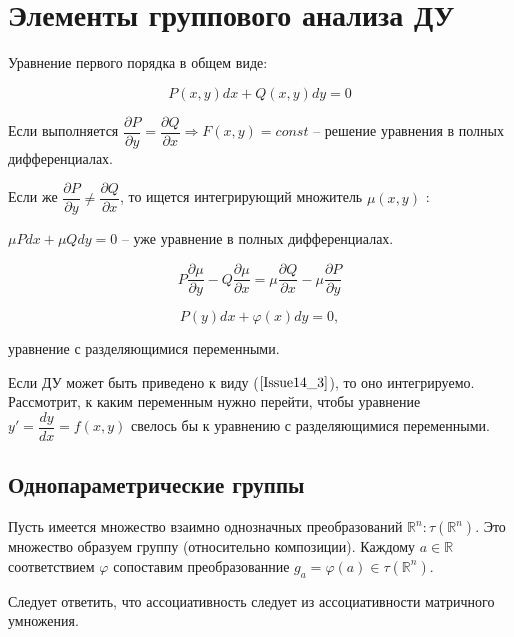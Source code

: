  




\section{Элементы группового анализа ДУ}

Уравнение первого порядка в общем виде:

\begin{equation}
	P(x,y)dx + Q(x,y)dy = 0
	\label{Issue14_1}
\end{equation}

Если выполняется $\dfrac{\partial P}{\partial y} = \dfrac{\partial Q}{\partial x} \Rightarrow F(x,y) = const$ -- решение уравнения в полных дифференциалах.

Если же $\dfrac{\partial P}{\partial y} \neq \dfrac{\partial Q}{\partial x}$, то ищется интегрирующий множитель $\mu(x,y)$ :

$\mu Pdx + \mu Qdy = 0$ -- уже уравнение в полных дифференциалах.

\begin{equation}
	P\frac{\partial \mu}{\partial y} - Q \frac{\partial \mu}{\partial x} = \mu \dfrac{\partial Q}{\partial x} - \mu \dfrac{\partial P}{\partial y}
	\label{Issue14_2}
\end{equation}

\begin{equation}
	P(y)dx + \varphi(x)dy = 0,
	\label{Issue14_3}
\end{equation}

уравнение с разделяющимися переменными.

Если ДУ может быть приведено к виду ($\ref{Issue14_3}$), то оно интегрируемо. Рассмотрит, к каким переменным нужно перейти, чтобы уравнение $y' = \dfrac{dy}{dx} = f(x,y)$ свелось бы к уравнению с разделяющимися переменными.

\subsection{Однопараметрические группы}

Пусть имеется множество взаимно однозначных преобразований $\mathbb{R}^n: \tau(\mathbb{R}^n)$.
Это множество образуем группу (относительно композиции). Каждому $a \in \mathbb{R}$ соответствием $\varphi$ сопоставим преобразованние $g_a = \varphi(a) \in \tau(\mathbb{R}^n)$.

Следует ответить, что ассоциативность следует из ассоциативности матричного умножения.

